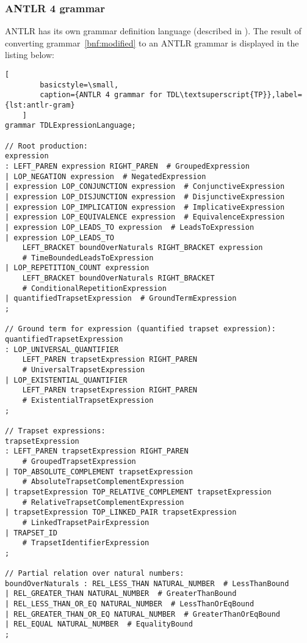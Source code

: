 \documentclass[12pt,oneside,a4paper,notitlepage]{report}
\begin{document}
	\subsubsection*{ANTLR 4 grammar}
	\par ANTLR has its own grammar definition language (described in \cite{antlrtutorial}). The result of converting grammar~\ref{bnf:modified} to an ANTLR  grammar is displayed in the listing below:
	
	\begin{lstlisting}[
		basicstyle=\small,
		caption={ANTLR 4 grammar for TDL\textsuperscript{TP}},label={lst:antlr-gram}
	]
grammar TDLExpressionLanguage;

// Root production:
expression
: LEFT_PAREN expression RIGHT_PAREN  # GroupedExpression
| LOP_NEGATION expression  # NegatedExpression
| expression LOP_CONJUNCTION expression  # ConjunctiveExpression
| expression LOP_DISJUNCTION expression  # DisjunctiveExpression
| expression LOP_IMPLICATION expression  # ImplicativeExpression
| expression LOP_EQUIVALENCE expression  # EquivalenceExpression
| expression LOP_LEADS_TO expression  # LeadsToExpression
| expression LOP_LEADS_TO
	LEFT_BRACKET boundOverNaturals RIGHT_BRACKET expression 
	# TimeBoundedLeadsToExpression
| LOP_REPETITION_COUNT expression
	LEFT_BRACKET boundOverNaturals RIGHT_BRACKET 
	# ConditionalRepetitionExpression
| quantifiedTrapsetExpression  # GroundTermExpression
;

// Ground term for expression (quantified trapset expression):
quantifiedTrapsetExpression
: LOP_UNIVERSAL_QUANTIFIER
	LEFT_PAREN trapsetExpression RIGHT_PAREN
	# UniversalTrapsetExpression
| LOP_EXISTENTIAL_QUANTIFIER
	LEFT_PAREN trapsetExpression RIGHT_PAREN
	# ExistentialTrapsetExpression
;

// Trapset expressions:
trapsetExpression
: LEFT_PAREN trapsetExpression RIGHT_PAREN
	# GroupedTrapsetExpression
| TOP_ABSOLUTE_COMPLEMENT trapsetExpression
	# AbsoluteTrapsetComplementExpression
| trapsetExpression TOP_RELATIVE_COMPLEMENT trapsetExpression
	# RelativeTrapsetComplementExpression
| trapsetExpression TOP_LINKED_PAIR trapsetExpression
	# LinkedTrapsetPairExpression
| TRAPSET_ID
	# TrapsetIdentifierExpression
;

// Partial relation over natural numbers:
boundOverNaturals : REL_LESS_THAN NATURAL_NUMBER  # LessThanBound
| REL_GREATER_THAN NATURAL_NUMBER  # GreaterThanBound
| REL_LESS_THAN_OR_EQ NATURAL_NUMBER  # LessThanOrEqBound
| REL_GREATER_THAN_OR_EQ NATURAL_NUMBER  # GreaterThanOrEqBound
| REL_EQUAL NATURAL_NUMBER  # EqualityBound
;


\end{lstlisting}
\end{document}
